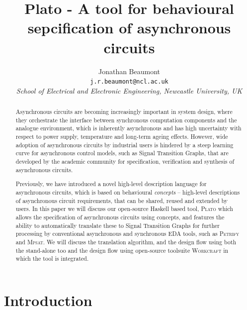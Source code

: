 \documentclass[british,conference,compsoc]{IEEEtran}
\newcommand{\noun}[1]{\textsc{#1}}
\begin{document}
\twocolumn

\title{Plato - A tool for behavioural 
\\ sepcification of asynchronous circuits}
\author{Jonathan Beaumont\\
\texttt{j.r.beaumont@ncl.ac.uk}\\
\emph{School of Electrical and Electronic Engineering, Newcastle University,
UK}}

\maketitle

\begin{abstract}
Asynchronous circuits are becoming increasingly important in
system design, where they orchestrate
the interface between synchronous computation components
and the analogue environment, which is inherently asynchronous
and has high uncertainty with respect to power supply,
temperature and long-term ageing effects.
However, wide adoption of asynchronous circuits by industrial users is
hindered by a steep learning curve for asynchronous control models,
such as Signal Transition Graphs, that are developed by the academic
community for specification, verification and synthesis of
asynchronous circuits.

Previously, we have introduced a novel high-level description language
for asynchronous circuits, which is based on behavioural
\textit{concepts} -- high-level descriptions of asynchronous circuit
requirements, that can be shared, reused and extended by users. 
In this paper we will discuss our open-source Haskell based tool, \noun{Plato} 
which allows the specification of asynchronous circuits using concepts, and 
features the ability to automatically translate these to Signal Transition 
Graphs for further processing by conventional asynchronous and synchronous EDA 
tools, such as \noun{Petrify} and \noun{Mpsat}. We will discuss the translation
algorithm, and the design flow using both the stand-alone too and the design 
flow using open-source toolsuite \noun{Workcraft} in which the tool is 
integrated.
\end{abstract}

\sloppy
\thispagestyle{empty}

\vspace{-3mm}

\section{Introduction}
\end{document}
